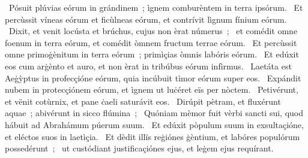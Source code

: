 {~Pósuit plúvias eórum in grándinem~; ìgnem comburèntem in terra ipsórum. 
~Et percùssit víneas eórum et ficùlneas eórum, et contrívit lìgnum fínium eórum. 
~Dixit, et venit locústa et brúchus, cujus non èrat númerus~; 
~et comédit omne foenum in terra eórum, et comédit òmnem fructum terrae eórum. 
~Et percùssit omne primoġènitum in terra eórum~; primìçias òmnis labóris eórum. 
~Et edúxit eos cum arġènto et auro, et non èrat in tribúbus eórum infìrmus. 
~Laetáta est Aeġỳptus in profecçióne eórum, quia incúbuit tìmor eórum super eos. 
~Expándit nubem in protecçiónem eórum, et ìgnem ut luċéret eïs per nòctem. 
~Petivérunt, et vënit cotùrnix, et pane ċaeli saturávit eos. 
~Dirúpit pètram, et fluxérunt aquae~; abivérunt in sicco flúmina~; 
~Quóniam mèmor fuit vèrbi sancti sui, quod hábuit ad Abrahámum púerum suum. 
~Et edúxit pòpulum suum in exsultaçióne, et eléctos suos in laetìçia. 
~Et dèdit illïs reġiónes ġèntium, et labóres populórum possedérunt~; 
~ut custódiant justificaçiónes ejus, et leġem ejus requírant. 
}
